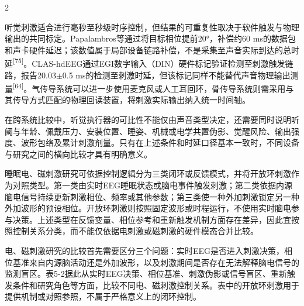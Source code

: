 \documentclass[UTF8,zihao=5,fontset=none]{ctexart}
\newcommand{\hei}{\CJKfamily{hei}}
\newcommand{\leveltwo}[1]{%
  \par\noindent{\hei\fontsize{10pt}{12pt}\selectfont\bfseries #1\par}}
\newcommand{\refcite}[1]{\nolinebreak[4]\textsuperscript{[#1]}}
\begin{document}
\begin{multicols}{2}

听觉刺激适合进行毫秒至秒级时序控制，但结果的可重复性取决于软件触发与物理输出的共同标定。Papalambros等通过将目标相位提前20°，补偿约60 ms的数据包和声卡硬件延迟；该数值属于局部设备链路补偿，不是采集至声音实际到达的总时延\refcite{75}。CLAS-hdEEG通过EGI数字输入（DIN）硬件标记验证检测至刺激触发链路，报告20.03$\pm$0.5 ms的检测至刺激时延，但该标记同样不能替代声音物理输出测量\refcite{64}。气传导系统可以进一步使用麦克风或人工耳回环，骨传导系统则需采用与其传导方式匹配的物理回读装置，将刺激实际输出纳入统一时间轴。\par

在跨系统比较中，听觉执行器的可比性不能仅由声音类型决定，还需要同时说明听阈与年龄、佩戴压力、安装位置、睡姿、机械或电学共置伪影、觉醒风险、输出强度、波形包络及累计刺激剂量。只有在上述条件和时延口径基本一致时，不同设备与研究之间的横向比较才具有明确意义。\par

\leveltwo{5.2 电刺激与磁刺激}

睡眠电、磁刺激研究可依据控制逻辑分为三类闭环或反馈模式，并将开放环刺激作为对照类型。第一类由实时EEG睡眠状态或脑电事件触发刺激；第二类依据内源脑电信号持续更新刺激相位、频率或其他参数；第三类使一种外加刺激锁定另一种外加波形的预设相位。开放环刺激则按照固定波形或时程运行，不使用实时脑电参与决策。上述类型在反馈变量、相位参考和重新触发机制方面存在差异，因此宜按照控制关系分类，而不能仅依据电刺激或磁刺激的硬件模态合并比较。\par

电、磁刺激研究的比较首先需要区分三个问题：实时EEG是否进入刺激决策，相位基准来自内源脑活动还是外加波形，以及刺激期间是否存在无法解释脑电信号的监测盲区。表5-2据此从实时EEG决策、相位基准、刺激伪影或信号盲区、重新触发条件和研究角色等方面，比较不同电、磁刺激控制关系。表中的开放环刺激用于提供机制或对照参照，不属于严格意义上的闭环控制。\par

\end{multicols}
\end{document}
